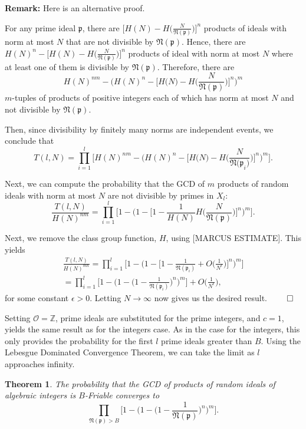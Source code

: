 \documentclass[10pt,a4paper]{article}
\newtheorem{theorem}{Theorem}[section]
\theoremstyle{definition}
\theoremstyle{remark}
\newcommand{\f}[1]{\mathfrak{#1}}
\begin{document}
\noindent \textbf{Remark:} Here is an alternative proof. 

\vspace{.1 in}
	\noindent For any prime ideal $\mathfrak{p}$, there are $\bigl[H(N)-H\bigl(\frac{N}{\f{N(p)}}\bigr)\bigr]^n$ products of ideals with norm at most $N$ that are not divisible by $\f{N(p)}$. Hence, there are  $H(N)^n-\bigl[H(N)-H\bigl(\frac{N}{\f{N(p)}}\bigr)\bigr]^n$ products of ideal with norm at most \(N\) where at least one of them is divisible by $\f{N(p)}$. Therefore, there are $$H(N)^{nm}-\biggl(H(N)^n-\biggl[H\bigl(N\bigl)-H\biggl(\frac{N}{\f{N(p)}}\biggl)\biggl]^n\biggl)^m$$ $m$-tuples of products of positive integers each of which has norm at most $N$ and not divisible by $\f{N(p)}$.
	
	Then, since divisibility by finitely many norms are independent events, we conclude that $$T(l,N)=\prod_{i=1}^{l}\biggl[H(N)^{nm}-\biggl(H(N)^n-\biggl[H\bigl(N\bigl)-H\biggl(\frac{N}{\f{N(p}_i)}\biggl)\biggl]^n\biggl)^m\biggr].$$
	
	Next, we can compute the probability that the GCD of \(m\) products of random ideals with norm at most \(N\) are not divisible by primes in \(X_l\):
	 $$\frac{T(l,N)}{H(N)^{nm}}=\prod_{i=1}^{l}\biggl[1-\biggl(1-\biggl[1-\frac{1}{H(N)}H\biggl(\frac{N}{\f{N(p)}}\biggr)\biggl]^n\biggr)^m\biggr].$$
	
	Next, we remove the class group function, \(H\), using [MARCUS ESTIMATE]. This yields
	\begin{align}
		\frac{T(l,N)}{H(N)^{mn}}=\prod_{i=1}^{l}\biggr[1-\biggr(1-\biggl[1-\frac{1}{\f{N}(\f{p}_i)}+O\biggl(\frac{1}{N^{\epsilon}}\biggl)\biggr]^n\biggr)^m\biggr]\\
		=\prod_{i=1}^{l}\biggr[1-\biggr(1-\biggl(1-\frac{1}{\f{N}(\f{p}_i)}\biggr)^n\biggr)^m\biggr] + O\Big(\frac{1}{N^{\epsilon}}\Big),
	\end{align}
	for some constant \(\epsilon > 0\).
	Letting \(N\to\infty\) now gives us the desired result. $\qed$\newline

Setting \(\mathcal{O}=\mathbb{Z}\), prime ideals are substituted for the prime integers, and \(c=1\), yields the same result as for the integers case. As in the case for the integers, this only provides the probability for the first \(l\) prime ideals greater than \(B\). Using the Lebesgue Dominated Convergence Theorem, we can take the limit as \(l\) approaches infinity.

\begin{theorem}
The probability that the GCD of products of random ideals of algebraic integers is $B$-Friable converges to
$$\prod_{\f{N}(\f{p})>B}\Big[1 - \Big(1 - \Big(1 - \frac{1}{\f{N}(\f{p})}\Big)^n \Big)^m \Big].$$
\end{theorem}
\end{document}

